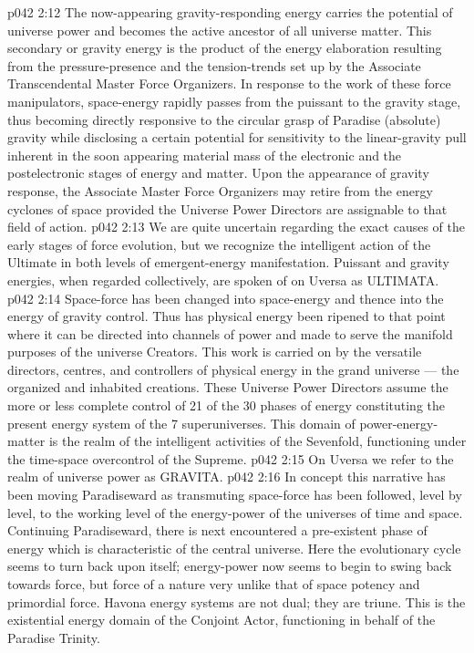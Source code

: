 \vs p042 2:12 \bibnobreakspace {} The now\hyp{}appearing gravity\hyp{}responding energy carries the potential of universe power and becomes the active ancestor of all universe matter. This secondary or gravity energy is the product of the energy elaboration resulting from the pressure\hyp{}presence and the tension\hyp{}trends set up by the Associate Transcendental Master Force Organizers. In response to the work of these force manipulators, space\hyp{}energy rapidly passes from the puissant to the gravity stage, thus becoming directly responsive to the circular grasp of Paradise (absolute) gravity while disclosing a certain potential for sensitivity to the linear\hyp{}gravity pull inherent in the soon appearing material mass of the electronic and the postelectronic stages of energy and matter. Upon the appearance of gravity response, the Associate Master Force Organizers may retire from the energy cyclones of space provided the Universe Power Directors are assignable to that field of action.
\vs p042 2:13 \pc We are quite uncertain regarding the exact causes of the early stages of force evolution, but we recognize the intelligent action of the Ultimate in both levels of emergent\hyp{}energy manifestation. Puissant and gravity energies, when regarded collectively, are spoken of on Uversa as ULTIMATA.
\vs p042 2:14 \bibnobreakspace {} Space\hyp{}force has been changed into space\hyp{}energy and thence into the energy of gravity control. Thus has physical energy been ripened to that point where it can be directed into channels of power and made to serve the manifold purposes of the universe Creators. This work is carried on by the versatile directors, centres, and controllers of physical energy in the grand universe --- the organized and inhabited creations. These Universe Power Directors assume the more or less complete control of 21 of the 30 phases of energy constituting the present energy system of the 7 superuniverses. This domain of power\hyp{}energy\hyp{}matter is the realm of the intelligent activities of the Sevenfold, functioning under the time\hyp{}space overcontrol of the Supreme.
\vs p042 2:15 On Uversa we refer to the realm of universe power as GRAVITA.
\vs p042 2:16 \bibnobreakspace {} In concept this narrative has been moving Paradiseward as transmuting space\hyp{}force has been followed, level by level, to the working level of the energy\hyp{}power of the universes of time and space. Continuing Paradiseward, there is next encountered a pre\hyp{}existent phase of energy which is characteristic of the central universe. Here the evolutionary cycle seems to turn back upon itself; energy\hyp{}power now seems to begin to swing back towards force, but force of a nature very unlike that of space potency and primordial force. Havona energy systems are not dual; they are triune. This is the existential energy domain of the Conjoint Actor, functioning in behalf of the Paradise Trinity.
